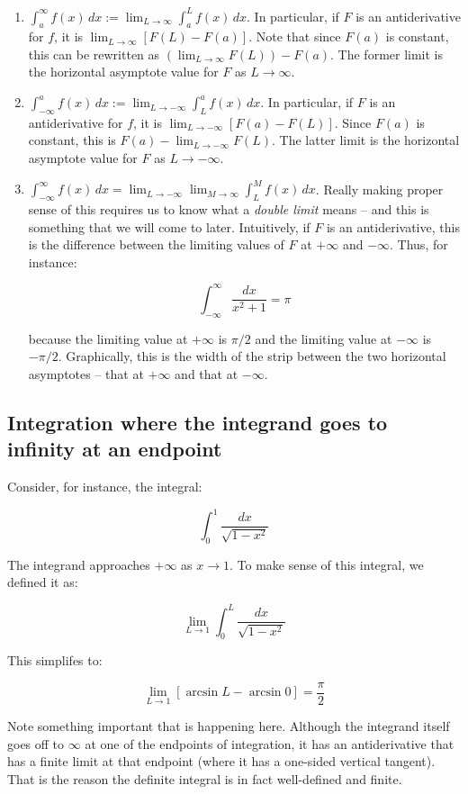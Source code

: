 \documentclass[10pt]{amsart}
\begin{document}
\begin{enumerate}
\item $\int_a^\infty f(x) \, dx := \lim_{L \to \infty} \int_a^L f(x)
  \, dx$. In particular, if $F$ is an antiderivative for $f$, it is
  $\lim_{L \to \infty} [F(L) - F(a)]$. Note that since $F(a)$ is
  constant, this can be rewritten as $(\lim_{L \to \infty} F(L)) -
  F(a)$. The former limit is the horizontal asymptote value for $F$ as
  $L \to \infty$.
\item $\int_{-\infty}^a f(x) \, dx := \lim_{L \to -\infty} \int_L^a
  f(x) \, dx$. In particular, if $F$ is an antiderivative for $f$, it
  is $\lim_{L \to -\infty} [F(a) - F(L)]$. Since $F(a)$ is constant, this
  is $F(a) - \lim_{L \to -\infty} F(L)$. The latter limit is the
  horizontal asymptote value for $F$ as $L \to -\infty$.
\item $\int_{-\infty}^\infty f(x) \, dx = \lim_{L \to -\infty} \lim_{M
  \to \infty} \int_L^M f(x) \, dx$. Really making proper sense of this
  requires us to know what a {\em double limit} means -- and this is
  something that we will come to later. Intuitively, if $F$ is an
  antiderivative, this is the difference between the limiting values
  of $F$ at $+\infty$ and $-\infty$. Thus, for instance:

  $$\int_{-\infty}^\infty \frac{dx}{x^2 + 1} = \pi$$

  because the limiting value at $+\infty$ is $\pi/2$ and the limiting
  value at $-\infty$ is $-\pi/2$. Graphically, this is the width of
  the strip between the two horizontal asymptotes -- that at $+\infty$
  and that at $-\infty$.
\end{enumerate}

\subsection{Integration where the integrand goes to infinity at an endpoint}

Consider, for instance, the integral:

$$\int_0^1 \frac{dx}{\sqrt{1 - x^2}}$$

The integrand approaches $+\infty$ as $x \to 1$. To make sense of this
integral, we defined it as:

$$\lim_{L \to 1} \int_0^L \frac{dx}{\sqrt{1 - x^2}}$$

This simplifes to:

$$\lim_{L \to 1} [\arcsin L - \arcsin 0] = \frac{\pi}{2}$$

Note something important that is happening here. Although the
integrand itself goes off to $\infty$ at one of the endpoints of
integration, it has an antiderivative that has a finite limit at that
endpoint (where it has a one-sided vertical tangent). That is the
reason the definite integral is in fact well-defined and finite.
\end{document}
